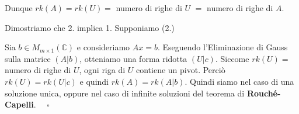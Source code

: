 \documentclass[a4paper]{article}
\theoremstyle{break}
\theoremstyle{break}
\theoremstyle{break}
\theoremstyle{break}
\begin{document}
\vspace{1em}
\noindent Dunque \( rk(A) = rk(U) = \) numero di righe di \( U \) \( = \) numero di righe di \( A \).

\vspace{2em}
\noindent Dimostriamo che 2. implica 1. Supponiamo (2.)

\vspace{1em}
\noindent Sia \( b \in  M_{m \times 1}(\mathbb{C}) \) e consideriamo \( Ax = b \). Eseguendo l'Eliminazione
di Gauss sulla matrice \( (A|b) \), otteniamo una forma ridotta \( (U|c) \).
Siccome \( rk(U) = \) numero di righe di \( U \), ogni riga di \( U \) contiene un pivot.
Perciò \( rk(U) = rk(U|c) \) e quindi \( rk(A) = rk(A|b) \). Quindi siamo nel caso di
una soluzione unica, oppure nel caso di infinite soluzioni del teorema di \textbf{Rouché-Capelli}.
\( \quad \square \) 
\end{document}
